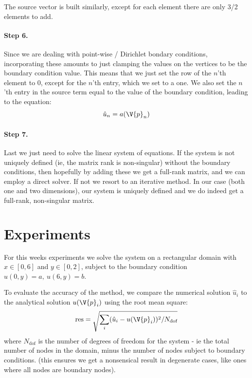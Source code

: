 \documentclass[sigconf]{acmart}
\begin{document}
The source vector is built similarly, except for each element there are only 3/2 elements to add.

\paragraph{Step 6.}
Since we are dealing with point-wise / Dirichlet bondary conditions, incorporating these amounts to just clamping the values on the vertices to be the boundary condition value. This means that we just set the row of the $ n $'th element to 0, except for the $ n $'th entry, which we set to a one. We also set the $ n $'th entry in the source term equal to the value of the boundary condition, leading to the equation:
\begin{equation}\label{key}
	\hat{u}_n = a(\V{p}_n)
\end{equation}

\paragraph{Step 7.} Last we just need to solve the linear system of equations. If the system is not uniquely defined (ie, the matrix rank is non-singular) without the boundary conditions, then hopefully by adding these we get a full-rank matrix, and we can employ a direct solver. If not we resort to an iterative method. In our case (both one and two dimensions), our system is uniquely defined and we do indeed get a full-rank, non-singular matrix.

\section{Experiments}
For this weeks experiments we solve the system on a rectangular domain with $ x \in [0, 6] $ and $ y \in [0, 2] $, subject to the boundary condition $ u(0, y) = a, \ u(6, y) = b $.

To evaluate the accuracy of the method, we compare the numerical solution $ \hat{u}_i $ to the analytical solution $ u(\V{p}_i) $ using the root mean square:
\begin{equation}\label{key}
	\text{res} = \sqrt{\sum_{i} (\hat{u}_i - u(\V{p}_i))^2/N_{\text{dof}}}
\end{equation}
where $ N_{\text{dof}} $ is the number of degrees of freedom for the system - ie the total number of nodes in the domain, minus the number of nodes subject to boundary conditions. (this ensures we get a nonsensical result in degenerate cases, like ones where all nodes are boundary nodes).
\end{document}
